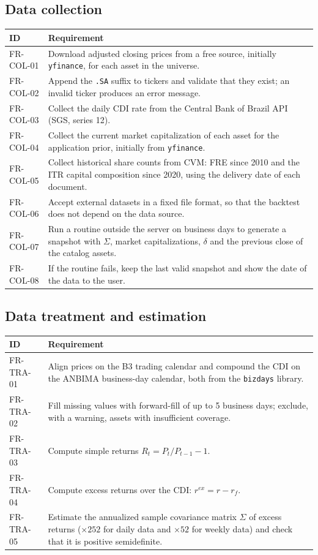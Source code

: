 \subsection{Data collection}
\begin{tabularx}{\textwidth}{@{}lX@{}}
\toprule
\textbf{ID} & \textbf{Requirement} \\ \midrule
FR-COL-01 & Download adjusted closing prices from a free source, initially \texttt{yfinance}, for each asset in the universe. \\
FR-COL-02 & Append the \texttt{.SA} suffix to tickers and validate that they exist; an invalid ticker produces an error message. \\
FR-COL-03 & Collect the daily CDI rate from the Central Bank of Brazil API (SGS, series 12). \\
FR-COL-04 & Collect the current market capitalization of each asset for the application prior, initially from \texttt{yfinance}. \\
FR-COL-05 & Collect historical share counts from CVM: FRE since 2010 and the ITR capital composition since 2020, using the delivery date of each document. \\
FR-COL-06 & Accept external datasets in a fixed file format, so that the backtest does not depend on the data source. \\
FR-COL-07 & Run a routine outside the server on business days to generate a snapshot with $\Sigma$, market capitalizations, $\delta$ and the previous close of the catalog assets. \\
FR-COL-08 & If the routine fails, keep the last valid snapshot and show the date of the data to the user. \\
\bottomrule
\end{tabularx}

\subsection{Data treatment and estimation}
\begin{tabularx}{\textwidth}{@{}lX@{}}
\toprule
\textbf{ID} & \textbf{Requirement} \\ \midrule
FR-TRA-01 & Align prices on the B3 trading calendar and compound the CDI on the ANBIMA business-day calendar, both from the \texttt{bizdays} library. \\
FR-TRA-02 & Fill missing values with forward-fill of up to 5 business days; exclude, with a warning, assets with insufficient coverage. \\
FR-TRA-03 & Compute simple returns $R_t = P_t/P_{t-1} - 1$. \\
FR-TRA-04 & Compute excess returns over the CDI: $r^{ex} = r - r_f$. \\
FR-TRA-05 & Estimate the annualized sample covariance matrix $\Sigma$ of excess returns ($\times 252$ for daily data and $\times 52$ for weekly data) and check that it is positive semidefinite. \\
\bottomrule
\end{tabularx}

